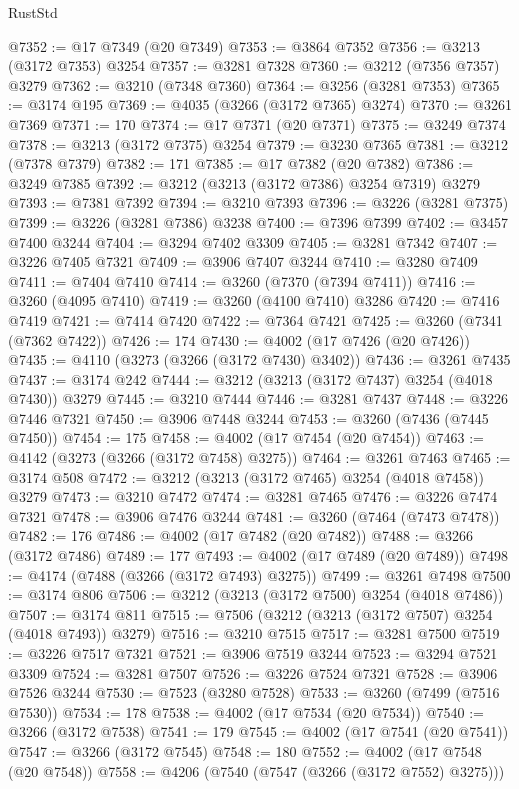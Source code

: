 \begin{lexlean}{RustStd}
\begin{coremodule}
@7352 := @17 @7349 (@20 @7349)
@7353 := @3864 @7352
@7356 := @3213 (@3172 @7353) @3254
@7357 := @3281 @7328
@7360 := @3212 (@7356 @7357) @3279
@7362 := @3210 (@7348 @7360)
@7364 := @3256 (@3281 @7353)
@7365 := @3174 @195
@7369 := @4035 (@3266 (@3172 @7365) @3274)
@7370 := @3261 @7369
@7371 := 170
@7374 := @17 @7371 (@20 @7371)
@7375 := @3249 @7374
@7378 := @3213 (@3172 @7375) @3254
@7379 := @3230 @7365
@7381 := @3212 (@7378 @7379)
@7382 := 171
@7385 := @17 @7382 (@20 @7382)
@7386 := @3249 @7385
@7392 := @3212 (@3213 (@3172 @7386) @3254 @7319) @3279
@7393 := @7381 @7392
@7394 := @3210 @7393
@7396 := @3226 (@3281 @7375)
@7399 := @3226 (@3281 @7386) @3238
@7400 := @7396 @7399
@7402 := @3457 @7400 @3244
@7404 := @3294 @7402 @3309
@7405 := @3281 @7342
@7407 := @3226 @7405 @7321
@7409 := @3906 @7407 @3244
@7410 := @3280 @7409
@7411 := @7404 @7410
@7414 := @3260 (@7370 (@7394 @7411))
@7416 := @3260 (@4095 @7410)
@7419 := @3260 (@4100 @7410) @3286
@7420 := @7416 @7419
@7421 := @7414 @7420
@7422 := @7364 @7421
@7425 := @3260 (@7341 (@7362 @7422))
@7426 := 174
@7430 := @4002 (@17 @7426 (@20 @7426))
@7435 := @4110 (@3273 (@3266 (@3172 @7430) @3402))
@7436 := @3261 @7435
@7437 := @3174 @242
@7444 := @3212 (@3213 (@3172 @7437) @3254 (@4018 @7430)) @3279
@7445 := @3210 @7444
@7446 := @3281 @7437
@7448 := @3226 @7446 @7321
@7450 := @3906 @7448 @3244
@7453 := @3260 (@7436 (@7445 @7450))
@7454 := 175
@7458 := @4002 (@17 @7454 (@20 @7454))
@7463 := @4142 (@3273 (@3266 (@3172 @7458) @3275))
@7464 := @3261 @7463
@7465 := @3174 @508
@7472 := @3212 (@3213 (@3172 @7465) @3254 (@4018 @7458)) @3279
@7473 := @3210 @7472
@7474 := @3281 @7465
@7476 := @3226 @7474 @7321
@7478 := @3906 @7476 @3244
@7481 := @3260 (@7464 (@7473 @7478))
@7482 := 176
@7486 := @4002 (@17 @7482 (@20 @7482))
@7488 := @3266 (@3172 @7486)
@7489 := 177
@7493 := @4002 (@17 @7489 (@20 @7489))
@7498 := @4174 (@7488 (@3266 (@3172 @7493) @3275))
@7499 := @3261 @7498
@7500 := @3174 @806
@7506 := @3212 (@3213 (@3172 @7500) @3254 (@4018 @7486))
@7507 := @3174 @811
@7515 := @7506 (@3212 (@3213 (@3172 @7507) @3254 (@4018 @7493)) @3279)
@7516 := @3210 @7515
@7517 := @3281 @7500
@7519 := @3226 @7517 @7321
@7521 := @3906 @7519 @3244
@7523 := @3294 @7521 @3309
@7524 := @3281 @7507
@7526 := @3226 @7524 @7321
@7528 := @3906 @7526 @3244
@7530 := @7523 (@3280 @7528)
@7533 := @3260 (@7499 (@7516 @7530))
@7534 := 178
@7538 := @4002 (@17 @7534 (@20 @7534))
@7540 := @3266 (@3172 @7538)
@7541 := 179
@7545 := @4002 (@17 @7541 (@20 @7541))
@7547 := @3266 (@3172 @7545)
@7548 := 180
@7552 := @4002 (@17 @7548 (@20 @7548))
@7558 := @4206 (@7540 (@7547 (@3266 (@3172 @7552) @3275)))

\end{coremodule}
\end{lexlean}
